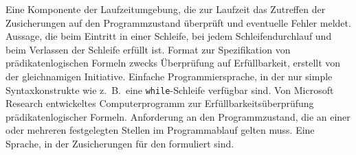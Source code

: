 \begin{description}
     Eine Komponente der Laufzeitumgebung, die zur Laufzeit das Zutreffen der Zusicherungen auf den Programmzustand überprüft und eventuelle Fehler meldet.
     Aussage, die beim Eintritt in einer Schleife, bei jedem Schleifendurchlauf und beim Verlassen der Schleife erfüllt ist.
     Format zur Spezifikation von prädikatenlogischen Formeln zwecks Überprüfung auf Erfüllbarkeit, erstellt von der gleichnamigen Initiative.
     Einfache Programmiersprache, in der nur simple Syntaxkonstrukte wie z.~B.\ eine \texttt{while}-Schleife verfügbar sind.
     Von Microsoft Research entwickeltes Computerprogramm zur Erfüllbarkeitsüberprüfung prädikatenlogischer Formeln.
     Anforderung an den Programmzustand, die an einer oder mehreren festgelegten Stellen im Programmablauf gelten muss.
     Eine Sprache, in der Zusicherungen für den  formuliert sind.
\end{description}

